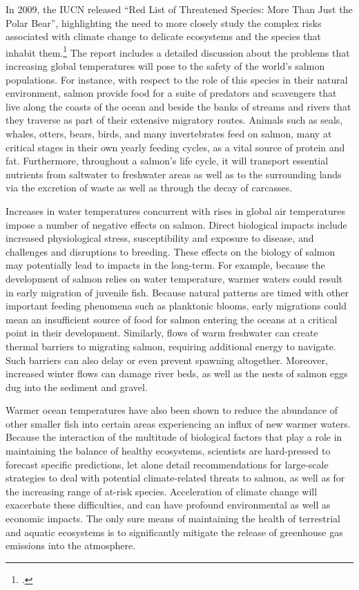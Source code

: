 In 2009, the IUCN released ``Red List of Threatened Species: More Than Just the Polar Bear'', highlighting the need to more closely study the complex risks associated with climate change to delicate ecosystems and the species that inhabit them.\footcite[][]{IUCNMorePolarBear}
The report includes a detailed discussion about the problems that increasing global temperatures will pose to the safety of the world's salmon populations. 
For instance, with respect to the role of this species in their natural environment, salmon provide food for a suite of predators and scavengers that live along the coasts of the ocean and beside the banks of streams and rivers that they traverse as part of their extensive migratory routes. 
Animals such as seals, whales, otters, bears, birds, and many invertebrates feed on salmon, many at critical stages in their own yearly feeding cycles, as a vital source of protein and fat. 
Furthermore, throughout a salmon's life cycle, it will transport essential nutrients from saltwater to freshwater areas as well as to the surrounding lands via the excretion of waste as well as through the decay of carcasses.



Increases in water temperatures concurrent with rises in global air temperatures impose a number of negative effects on salmon. 
Direct biological impacts include increased physiological stress, susceptibility and exposure to disease, and challenges and disruptions to breeding. 
These effects on the biology of salmon may potentially lead to impacts in the long-term. 
For example, because the development of salmon relies on water temperature, warmer waters could result in early migration of juvenile fish. 
Because natural patterns are timed with other important feeding phenomena such as planktonic blooms, early migrations could mean an insufficient source of food for salmon entering the oceans at a critical point in their development. 
Similarly, flows of warm freshwater can create thermal barriers to migrating salmon, requiring additional energy to navigate. 
Such barriers can also delay or even prevent spawning altogether. 
Moreover, increased winter flows can damage river beds, as well as the nests of salmon eggs dug into the sediment and gravel.



Warmer ocean temperatures have also been shown to reduce the abundance of other smaller fish into certain areas experiencing an influx of new warmer waters. 
Because the interaction of the multitude of biological factors that play a role in maintaining the balance of healthy ecosystems, scientists are hard-pressed to forecast specific predictions, let alone detail recommendations for large-scale strategies to deal with potential climate-related threats to salmon, as well as for the increasing range of at-risk species. 
Acceleration of climate change will exacerbate these difficulties, and can have profound environmental as well as economic impacts. 
The only sure means of maintaining the health of terrestrial and aquatic ecosystems is to significantly mitigate the release of greenhouse gas emissions into the atmosphere.



